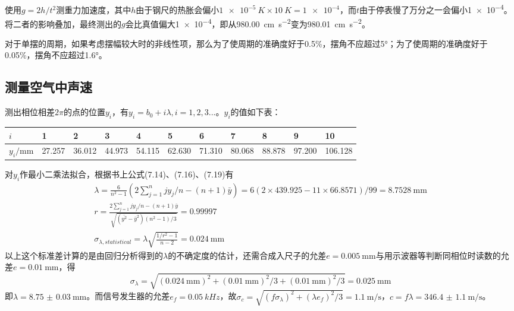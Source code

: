 \documentclass[UTF8]{ctexart}
\begin{document}
\subsection{}
使用$g=2h/t^2$测重力加速度，其中$h$由于钢尺的热胀会偏小$\SI{1e-5}{K}\times\SI{10}{K}=\num{1e-4}$，而$t$由于停表慢了万分之一会偏小\num{1e-4}。将二者的影响叠加，最终测出的$g$会比真值偏大\num{1e-4}，即从\SI{980.00}{\cm\per\second\squared}变为\SI{980.01}{\cm\per\second\squared}。

对于单摆的周期，如果考虑摆幅较大时的非线性项，那么为了使周期的准确度好于0.5\%，摆角不应超过\ang{5}；为了使周期的准确度好于0.05\%，摆角不应超过\ang{1.6}。
\subsection{测量空气中声速}
测出相位相差$2\pi$的点的位置$y_i$，有$y_i=b_0+i\lambda, i=1,2,3...$。$y_i$的值如下表：

\noindent\begin{tabu} to \linewidth {X|X X X X X X X X X X}
\hline
$i$ &1&2&3&4&5&6&7&8&9&10\\
\hline
$y_i/\si{\mm}$&27.257 &36.012 &44.973 &54.115 &62.630 &71.310 &80.068 &88.878 &97.200 &106.128\\
\hline
\end{tabu}

对$y_i$作最小二乘法拟合，根据书上公式(7.14)、(7.16)、(7.19)有
\begin{gather}
  \lambda=\frac{6}{n^2-1}(2\sum\limits_ {j=1}^{n}jy_j/n-(n+1)\bar{y})=6(2\times 439.925-11\times66.8571)/99=\SI{8.7528}{\mm}\\
  r=\frac{2\sum\limits_ {j=1}^{n}jy_j/n-(n+1)\bar{y}}{\sqrt{(\bar{y^2}-\bar{y}^2)(n^2-1)/3}}=0.99997\\
  \sigma_{\lambda,statistical}=\lambda\sqrt{\frac{1/r^2-1}{n-2}}=\SI{0.024}{\mm}
\end{gather}
以上这个标准差计算的是由回归分析得到的$\lambda$的不确定度的估计，还需合成入尺子的允差$e=\SI{0.005}{\mm}$与用示波器等判断同相位时读数的允差$e=\SI{0.01}{\mm}$，得
\begin{equation}
  \sigma_{\lambda}=\sqrt{(\SI{0.024}{\mm})^2+(\SI{0.01}{\mm})^2/3+(\SI{0.01}{\mm})^2/3}=\SI{0.025}{\mm}
\end{equation}
即$\lambda=\SI{8.75(3)}{\mm}$。而信号发生器的允差$e_f=\SI{0.05}{kHz}$，故$\sigma_c=\sqrt{(f\sigma_{\lambda})^2+(\lambda e_f)^2/3}=\SI{1.1}{\meter\per\second}$，$c=f\lambda=\SI{346.4(11)}{\meter\per\second}$。
\end{document}
